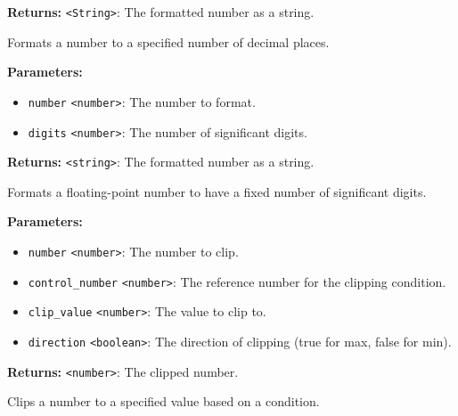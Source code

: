 \documentclass[12pt,a4paper]{article}
\begin{document}
\noindent \textbf{Returns:} \texttt{<String>}: The formatted number as a string.

\noindent Formats a number to a specified number of decimal places.

\vspace{5mm}
\noindent {}


\noindent \textbf{Parameters:}
\begin{itemize}
  \item \texttt{number} \texttt{<number>}: The number to format.
  \item \texttt{digits} \texttt{<number>}: The number of significant digits.
\end{itemize}

\noindent \textbf{Returns:} \texttt{<string>}: The formatted number as a string.

\noindent Formats a floating-point number to have a fixed number of significant digits.

\vspace{5mm}
\noindent {}


\noindent \textbf{Parameters:}
\begin{itemize}
  \item \texttt{number} \texttt{<number>}: The number to clip.
  \item \texttt{control\_number} \texttt{<number>}: The reference number for the clipping condition.
  \item \texttt{clip\_value} \texttt{<number>}: The value to clip to.
  \item \texttt{direction} \texttt{<boolean>}: The direction of clipping (true for max, false for min).
\end{itemize}

\noindent \textbf{Returns:} \texttt{<number>}: The clipped number.

\noindent Clips a number to a specified value based on a condition.

\vspace{5mm}
\noindent {}
\end{document}
